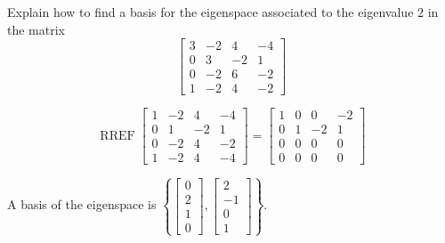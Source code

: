 
\begin{exerciseStatement}


Explain how to find a basis for the eigenspace associated to the eigenvalue \( 2 \) in the matrix \[ \left[\begin{array}{cccc}
3 & -2 & 4 & -4 \\
0 & 3 & -2 & 1 \\
0 & -2 & 6 & -2 \\
1 & -2 & 4 & -2
\end{array}\right] \]


\end{exerciseStatement}
    
\begin{exerciseAnswer} 


\[\operatorname{RREF} \left[\begin{array}{cccc}
1 & -2 & 4 & -4 \\
0 & 1 & -2 & 1 \\
0 & -2 & 4 & -2 \\
1 & -2 & 4 & -4
\end{array}\right] = \left[\begin{array}{cccc}
1 & 0 & 0 & -2 \\
0 & 1 & -2 & 1 \\
0 & 0 & 0 & 0 \\
0 & 0 & 0 & 0
\end{array}\right] \]



A basis of the eigenspace is \( \left\{ \left[\begin{array}{c}
0 \\
2 \\
1 \\
0
\end{array}\right] , \left[\begin{array}{c}
2 \\
-1 \\
0 \\
1
\end{array}\right] \right\} \).


\end{exerciseAnswer}
    
